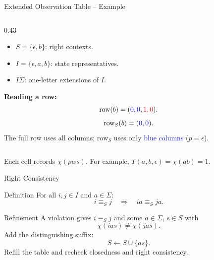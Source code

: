 \documentclass{beamer}
\begin{document}
\begin{frame}{Extended Observation Table -- Example}
\begin{columns}[T,onlytextwidth]
\begin{column}{0.43\textwidth}
\begin{itemize}
                \item $S=\{\epsilon,b\}$: right contexts.
                \item $I=\{\epsilon,a,b\}$: state representatives.
                \item $I\Sigma$: one-letter extensions of $I$.
            \end{itemize}
            \textbf{Reading a row:}
            $$
            \text{row}(b)=(\textcolor{blue}{0,0},\textcolor{red}{1,0}).
            $$
            $$
            \text{row}_S(b)=(\textcolor{blue}{0,0}).
            $$
            The full row uses all columns; $\text{row}_S$ uses only
            \textcolor{blue}{blue columns} ($p=\epsilon$).
        \end{column}
    \end{columns}
    \vspace{0.5em}
    {\small Each cell records $\chi(pws)$.
    For example, $T(a,b,\epsilon)=\chi(ab)=1$.}
\end{frame}

\begin{frame}{Right Consistency}
    \begin{block}{Definition}
        For all $i,j\in I$ and $a\in\Sigma$:
        $$
        i\equiv_S j\quad\Longrightarrow\quad ia\equiv_S ja.
        $$
    \end{block}
    \begin{block}{Refinement}
        A violation gives $i\equiv_S j$ and some $a\in\Sigma$, $s\in S$ with
        $$
        \chi(ias)\neq\chi(jas).
        $$
        Add the distinguishing suffix:
        $$
        S\leftarrow S\cup\{as\}.
        $$
        Refill the table and recheck closedness and right consistency.
    \end{block}
\end{frame}
\end{document}
